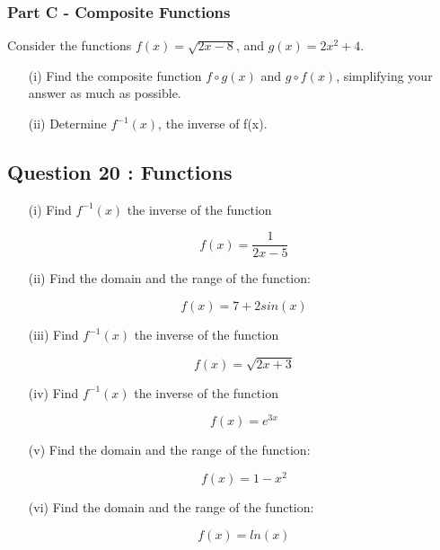 \documentclass[]{article}
\begin{document}


\subsubsection*{Part C - Composite Functions}
Consider the functions $f(x) = \sqrt{2x-8}$, and $g(x) = 2x^2 + 4$.
\begin{itemize}
	\item[(i)] Find the composite function $f \circ g(x)$ and $g \circ f(x)$,  simplifying your answer as much as possible.
	\item[(ii)] Determine $f^{-1}(x)$, the inverse of f(x).
\end{itemize}
















\subsection*{Question 20 : Functions}
\begin{itemize}
\item[(i)] Find $f^{-1}(x)$  the inverse of the function

\[f(x) = \frac{1}{2x-5}\]

\item[(ii)] Find the domain and the range of the function:

\[f(x) =  7 + 2 sin(x)\]

\item[(iii)] Find $f^{-1}(x)$  the inverse of the function

\[f(x) = \sqrt{2x + 3} \]

\item[(iv)] Find $f^{-1}(x)$ the inverse of the function

\[f(x) = e^{3x}\]

\item[(v)] Find the domain and the range of the function:

\[ f(x) = 1-x^2 \]

\item[(vi)] Find the domain and the range of the function:

\[f(x) = ln(x)\]

\end{itemize}
\end{document}
